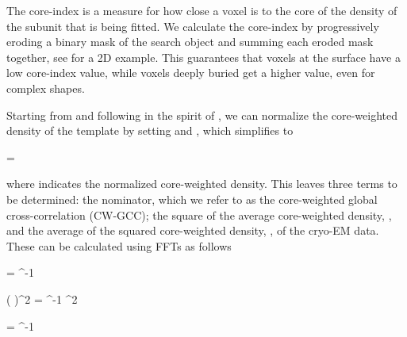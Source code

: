 
The core-index is a measure for how close a voxel is to the core of the density
of the subunit that is being fitted. We calculate the core-index by
progressively eroding a binary mask of the search object and summing each
eroded mask together, see  for
a 2D example. This guarantees that voxels at the surface have a low core-index
value, while voxels deeply buried get a higher value, even for complex shapes.  

{}


Starting from \ineq[eq:cw-lcc] and following in the spirit of
\citeauthor{Roseman2003}, we can normalize the core-weighted density  of the template by setting  and
, which simplifies \ineq[eq:cw-lcc] to

\startformula
{} = 
{}
\stopformula

where  indicates the normalized core-weighted density. This leaves
three terms to be determined: the nominator, which we refer to as the
core-weighted global cross-correlation (CW-GCC); the square of the average
core-weighted density, , and the average
of the squared core-weighted density, ,
of the cryo-EM data. These can be calculated using FFTs as follows 

\placeformula[eq:cw-gcc]
\startformula
{} = ^{-1} 
\stopformula

\startformula
\left(  \right)^2 = ^{-1} ^2
\stopformula

\startformula
{} = ^{-1} 
\stopformula

